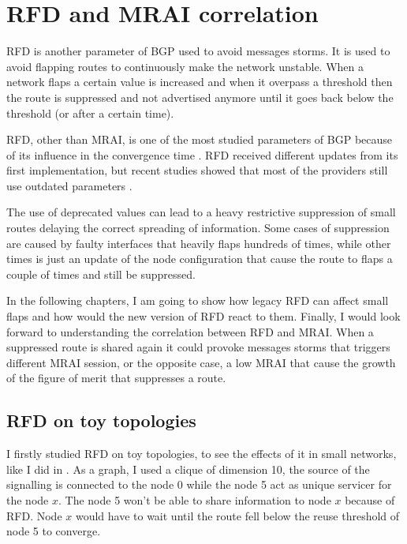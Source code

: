 \chapter{RFD and MRAI correlation}
\label{cha:bgp_rfd}


\ac{RFD} is another parameter of \ac{BGP} used to avoid messages storms.
It is used to avoid flapping routes to continuously make the network unstable.
When a network flaps a certain value is increased and when it overpass a threshold
then the route is suppressed and not advertised anymore until it goes back
below the threshold (or after a certain time).

\ac{RFD}, other than \ac{MRAI}, is one of the most studied parameters of \ac{BGP}
because of its influence in the convergence time \cite{mao2002route,pelsser2011route}.
\ac{RFD} received different updates from its first implementation, but recent 
studies showed that most of the providers still use outdated parameters \cite{gray2020bgp}.

The use of deprecated values can lead to a heavy restrictive suppression
of small routes delaying the correct spreading of information.
Some cases of suppression are caused by faulty interfaces that heavily flaps hundreds of times, 
while other times is just an update of the node configuration that
cause the route to flaps a couple of times and still be suppressed.

In the following chapters, I am going to show how legacy \ac{RFD} can affect 
small flaps and how would the new version of \ac{RFD} react to them.
Finally, I would look forward to understanding the correlation between \ac{RFD}
and \ac{MRAI}.
When a suppressed route is shared again it could provoke messages storms that
triggers different \ac{MRAI} session, or the opposite case, a low \ac{MRAI} that
cause the growth of the figure of merit that suppresses a route.

\section{RFD on toy topologies}
\label{sec:bgp_rfd_toy}

I firstly studied \ac{RFD} on toy topologies, to see the effects of it in small 
networks, like I did in .
As a graph, I used a clique of dimension \num{10}, the source of the signalling
is connected to the node \num{0} while the node \num{5} act as unique servicer
for the node $x$.
The node \num{5} won't be able to share information to node $x$ because of \ac{RFD}.
Node $x$ would have to wait until the route fell below the reuse threshold of 
node \num{5} to converge.

